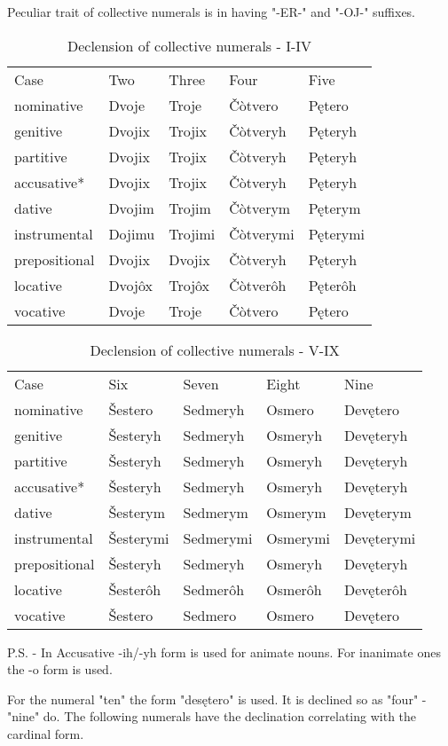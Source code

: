 Peculiar trait of collective numerals is in having "-ER-" and "-OJ-" suffixes.

\begin{table}[!htb]
	\caption{Declension of collective numerals - I-IV}
	\begin{tabular}{lllll}
		Case & Two & Three & Four & Five \\
		\gls{nominative} & Dvoje & Troje & Čòtvero & Pętero \\
		\gls{genitive} & Dvojix & Trojix & Čòtveryh & Pęteryh \\
		\gls{partitive} & Dvojix & Trojix & Čòtveryh & Pęteryh \\
		\gls{accusative}* & Dvojix & Trojix & Čòtveryh & Pęteryh \\
		\gls{dative} & Dvojim & Trojim & Čòtverym & Pęterym \\
		\gls{instrumental} & Dojimu & Trojimi & Čòtverymi & Pęterymi \\
		\gls{prepositional} & Dvojix & Dvojix & Čòtveryh & Pęteryh \\
		\gls{locative} & Dvojôx & Trojôx & Čòtverôh & Pęterôh \\
		\gls{vocative} & Dvoje & Troje & Čòtvero & Pętero \\
	\end{tabular}
\end{table}

\begin{table}[!htb]
	\caption{Declension of collective numerals - V-IX}
	\begin{tabular}{lllll}
		Case & Six & Seven & Eight & Nine \\
		\gls{nominative} & Šestero & Sedmeryh & Osmero & Devętero \\
		\gls{genitive} & Šesteryh & Sedmeryh & Osmeryh & Devęteryh \\
		\gls{partitive} & Šesteryh & Sedmeryh & Osmeryh & Devęteryh \\
		\gls{accusative}* & Šesteryh & Sedmeryh & Osmeryh & Devęteryh \\
		\gls{dative} & Šesterym & Sedmerym & Osmerym & Devęterym \\
		\gls{instrumental} & Šesterymi & Sedmerymi & Osmerymi & Devęterymi  \\
		\gls{prepositional}  & Šesteryh & Sedmeryh & Osmeryh & Devęteryh \\
		\gls{locative} & Šesterôh & Sedmerôh & Osmerôh & Devęterôh \\
		\gls{vocative} & Šestero & Sedmero & Osmero & Devętero \\
	\end{tabular}
\end{table}

P.S. - In Accusative -ih/-yh form is used for animate nouns. For inanimate ones the -o form is used.

For the numeral "ten" the form "desętero" is used. It is declined so as "four" - "nine" do. The following numerals have the declination correlating with the cardinal form.
